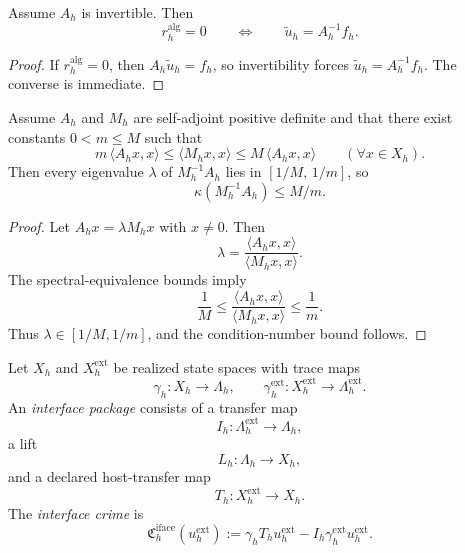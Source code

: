 \begin{theorem}
\label{thm:exact-solve-iff-algebraic-crime-vanishes}
Assume \(A_h\) is invertible. Then
\[
r_h^{\mathrm{alg}}=0
\qquad\Longleftrightarrow\qquad
\widetilde u_h=A_h^{-1}f_h.
\]
\end{theorem}

\begin{proof}
If \(r_h^{\mathrm{alg}}=0\), then \(A_h\widetilde u_h=f_h\), so invertibility
forces \(\widetilde u_h=A_h^{-1}f_h\). The converse is immediate.
\end{proof}

\begin{proposition}
\label{prop:spectral-equivalence-solver-certificate}
Assume \(A_h\) and \(M_h\) are self-adjoint positive definite and that there
exist constants \(0<m\le M\) such that
\[
m\,\langle A_hx,x\rangle
\le
\langle M_hx,x\rangle
\le
M\,\langle A_hx,x\rangle
\qquad
(\forall x\in X_h).
\]
Then every eigenvalue \(\lambda\) of \(M_h^{-1}A_h\) lies in
\([
1/M,\,
1/m
]\),
so
\[
\kappa(M_h^{-1}A_h)\le M/m.
\]
\end{proposition}

\begin{proof}
Let \(A_hx=\lambda M_hx\) with \(x\ne 0\). Then
\[
\lambda
=
\frac{\langle A_hx,x\rangle}{\langle M_hx,x\rangle}.
\]
The spectral-equivalence bounds imply
\[
\frac{1}{M}
\le
\frac{\langle A_hx,x\rangle}{\langle M_hx,x\rangle}
\le
\frac{1}{m}.
\]
Thus \(\lambda\in[1/M,1/m]\), and the condition-number bound follows.
\end{proof}

\begin{definition}
\label{def:interface-package-crime}
Let \(X_h\) and \(X_h^{\mathrm{ext}}\) be realized state spaces with trace maps
\[
\gamma_h:X_h\to \Lambda_h,
\qquad
\gamma_h^{\mathrm{ext}}:X_h^{\mathrm{ext}}\to \Lambda_h^{\mathrm{ext}}.
\]
An \emph{interface package} consists of a transfer map
\[
I_h:\Lambda_h^{\mathrm{ext}}\to \Lambda_h,
\]
a lift
\[
L_h:\Lambda_h\to X_h,
\]
and a declared host-transfer map
\[
T_h:X_h^{\mathrm{ext}}\to X_h.
\]
The \emph{interface crime} is
\[
\mathfrak C_h^{\mathrm{iface}}(u_h^{\mathrm{ext}})
:=
\gamma_hT_hu_h^{\mathrm{ext}}
-I_h\gamma_h^{\mathrm{ext}}u_h^{\mathrm{ext}}.
\]
\end{definition}

